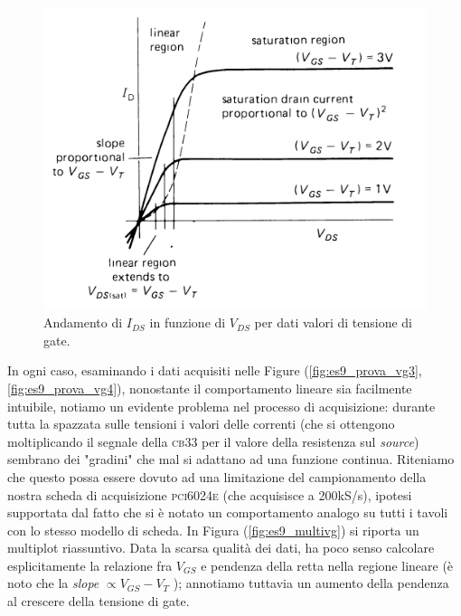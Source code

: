 \documentclass[journal, a4paper]{IEEEtran}
\begin{document}
\begin{figure}
\centering
\includegraphics[width=0.9\linewidth]{./horo-linear_saturation}
\caption{Andamento di $I_{DS}$ in funzione di $V_{DS}$ per dati valori di tensione di gate.}
\label{fig:horo-linear_saturation}
\end{figure}

In ogni caso, esaminando i dati acquisiti nelle Figure (\ref{fig:es9_prova_vg3}, \ref{fig:es9_prova_vg4}), nonostante il comportamento lineare sia facilmente intuibile, notiamo un evidente problema nel processo di acquisizione: durante tutta la spazzata sulle tensioni i valori delle correnti (che si ottengono moltiplicando il segnale della \textsc{cb33} per il valore della resistenza sul \textit{source}) sembrano dei "gradini" che mal si adattano ad una funzione continua. Riteniamo che questo possa essere dovuto ad una limitazione del campionamento della nostra scheda di acquisizione \textsc{pci6024e} (che acquisisce a 200kS/s), ipotesi supportata dal fatto che si è notato un comportamento analogo su tutti i tavoli con lo stesso modello di scheda. In Figura (\ref{fig:es9_multivg}) si riporta un multiplot riassuntivo. Data la scarsa qualità dei dati, ha poco senso calcolare esplicitamente la relazione fra $V_{GS}$ e pendenza della retta nella regione lineare (è noto che la \textit{slope} $ \propto V_{GS} - V_T$ ); annotiamo tuttavia un aumento della pendenza al crescere della tensione di gate.\\
\end{document}
